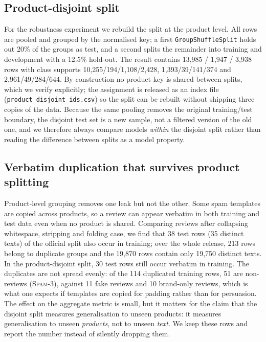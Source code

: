 \documentclass[12pt,a4paper]{article}
\begin{document}
\subsection{Product-disjoint split}
For the robustness experiment we rebuild the split at the product level. All rows are pooled and grouped by the normalised key; a first \texttt{GroupShuffleSplit} holds out 20\% of the groups as test, and a second splits the remainder into training and development with a 12.5\% hold-out. The result contains 13{,}985 / 1{,}947 / 3{,}938 rows with class supports 10{,}255/194/1{,}108/2{,}428, 1{,}393/39/141/374 and 2{,}961/49/284/644. By construction no product key is shared between splits, which we verify explicitly; the assignment is released as an index file (\texttt{product\_\allowbreak disjoint\_\allowbreak ids.csv}) so the split can be rebuilt without shipping three copies of the data. Because the same pooling removes the original training/test boundary, the disjoint test set is a new sample, not a filtered version of the old one, and we therefore always compare models \emph{within} the disjoint split rather than reading the difference between splits as a model property.

\subsection{Verbatim duplication that survives product splitting}
Product-level grouping removes one leak but not the other. Some spam templates are copied across products, so a review can appear verbatim in both training and test data even when no product is shared. Comparing reviews after collapsing whitespace, stripping and folding case, we find that 38 test rows (35 distinct texts) of the official split also occur in training; over the whole release, 213 rows belong to duplicate groups and the 19{,}870 rows contain only 19{,}750 distinct texts. In the product-disjoint split, 30 test rows still occur verbatim in training. The duplicates are not spread evenly: of the 114 duplicated training rows, 51 are non-reviews (\textsc{Spam-3}), against 11 fake reviews and 10 brand-only reviews, which is what one expects if templates are copied for padding rather than for persuasion. The effect on the aggregate metric is small, but it matters for the claim that the disjoint split measures generalisation to unseen products: it measures generalisation to unseen \emph{products}, not to unseen \emph{text}. We keep these rows and report the number instead of silently dropping them.
\end{document}
